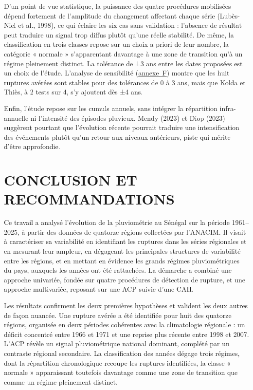 \documentclass[12pt,a4paper]{report}
\begin{document}
D'un point de vue statistique, la puissance des quatre procédures mobilisées dépend fortement de l'amplitude du changement affectant chaque série (Lubès-Niel et al., 1998), ce qui éclaire les six cas sans validation : l'absence de résultat peut traduire un signal trop diffus plutôt qu'une réelle stabilité. De même, la classification en trois classes repose sur un choix a priori de leur nombre, la catégorie « normale » s'apparentant davantage à une zone de transition qu'à un régime pleinement distinct. La tolérance de ±3 ans entre les dates proposées est un choix de l’étude. L’analyse de sensibilité (\hyperref[tab:sensibilite-tolerance-ruptures]{annexe~F}) montre que les huit ruptures avérées sont stables pour des tolérances de 0 à 3 ans, mais que Kolda et Thiès, à 2 tests sur 4, s’y ajoutent dès ±4 ans.

\enlargethispage{\baselineskip}
Enfin, l'étude repose sur les cumuls annuels, sans intégrer la répartition infra-annuelle ni l'intensité des épisodes pluvieux. Mendy (2023) et Diop (2023) suggèrent pourtant que l'évolution récente pourrait traduire une intensification des événements plutôt qu'un retour aux niveaux antérieurs, piste qui mérite d'être approfondie.

\clearpage
\begingroup
\let\clearpage\relax
\chapter*{CONCLUSION ET RECOMMANDATIONS}
\endgroup
{}
\thispagestyle{fancy}

Ce travail a analysé l’évolution de la pluviométrie au Sénégal sur la période 1961–2025, à partir des données de quatorze régions collectées par l’ANACIM. Il visait à caractériser sa variabilité en identifiant les ruptures dans les séries régionales et en mesurant leur ampleur, en dégageant les principales structures de variabilité entre les régions, et en mettant en évidence les grands régimes pluviométriques du pays, auxquels les années ont été rattachées. La démarche a combiné une approche univariée, fondée sur quatre procédures de détection de rupture, et une approche multivariée, reposant sur une ACP suivie d’une CAH.

Les résultats confirment les deux premières hypothèses et valident les deux autres de façon nuancée. Une rupture avérée a été identifiée pour huit des quatorze régions, organisée en deux périodes cohérentes avec la climatologie régionale : un déficit concentré entre 1966 et 1971 et une reprise plus récente entre 1998 et 2007. L’ACP révèle un signal pluviométrique national dominant, complété par un contraste régional secondaire. La classification des années dégage trois régimes, dont la répartition chronologique recoupe les ruptures identifiées, la classe « normale » apparaissant toutefois davantage comme une zone de transition que comme un régime pleinement distinct.
\end{document}
